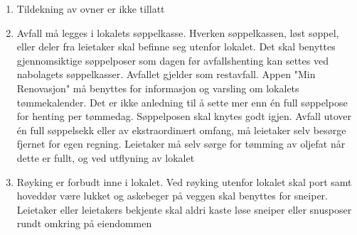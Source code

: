 \begin{enumerate}
        \item Tildekning av ovner er ikke tillatt

        \item Avfall må legges i lokalets søppelkasse. Hverken søppelkassen, løst søppel, eller deler fra leietaker skal befinne seg utenfor lokalet.
        Det skal benyttes gjennomsiktige søppelposer som dagen før avfallshenting kan settes ved nabolagets søppelkasser. Avfallet gjelder som restavfall. Appen "Min Renovasjon" må benyttes for informasjon og varsling om lokalets tømmekalender. Det er ikke anledning til å sette mer enn én full søppelpose for henting per tømmedag. Søppelposen skal knytes godt igjen.
        Avfall utover én full søppelsekk eller av ekstraordinært omfang, må leietaker selv besørge fjernet for egen regning.
        Leietaker må selv sørge for tømming av oljefat når dette er fullt, og ved utflyning av lokalet

        \item Røyking er forbudt inne i lokalet. Ved røyking utenfor lokalet skal port samt hoveddør være lukket og askebeger på veggen skal benyttes for sneiper. Leietaker eller leietakers bekjente skal aldri kaste løse sneiper eller snusposer rundt omkring på eiendommen


    \end{enumerate}
